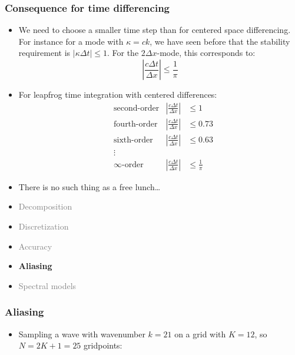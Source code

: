 \documentclass[aspectratio=149,9pt]{beamer}
\begin{document}
\begin{frame}
	\frametitle{Consequence for time differencing}
	\vfill\begin{itemize}
		\item We need to choose a smaller time step than for centered space differencing. For instance for a mode with $\kappa = c k$, we have seen before that the stability requirement is $| \kappa \Delta t | \le 1$. For the $2\Delta x$-mode, this corresponds to:
			\begin{equation*}
				\left| \frac{c \Delta t}{\Delta x} \right| \le \frac{1}{\pi}
			\end{equation*}\vfill
		\item For leapfrog time integration with centered differences:
			{\small
			\begin{align*}
				& \text{second-order} & \left|\frac{c\Delta t}{\Delta x}\right| & \le 1 \\
				& \text{fourth-order} & \left|\frac{c\Delta t}{\Delta x}\right| & \le 0.73 \\
				& \text{sixth-order} & \left|\frac{c\Delta t}{\Delta x}\right| & \le 0.63 \\
				&\vdots	\\
				& \infty\text{-order} & \left|\frac{c\Delta t}{\Delta x}\right| & \le \frac{1}{\pi}
			\end{align*}}\vfill
		\item There is no such thing as a free lunch\ldots
	\end{itemize}\vfill
\end{frame}
%
%
\begin{frame}
	\begin{itemize}
		\item \textcolor{gray}{Decomposition}
		\item \textcolor{gray}{Discretization}
		\item \textcolor{gray}{Accuracy}
		\item {\bfseries Aliasing}
		\item \textcolor{gray}{Spectral models}
	\end{itemize}
\end{frame}
%
%
\begin{frame}
	\frametitle{Aliasing}
	\vfill\begin{itemize}
		\item Sampling a wave with wavenumber $k=21$ on a grid with $K=12$, so $N=2K+1=25$ gridpoints:
			\begin{center}
				\only<2->{\scalebox{.7}{\small}}
			\end{center}\vfill
	\end{itemize}\vfill
\end{frame}
\end{document}
